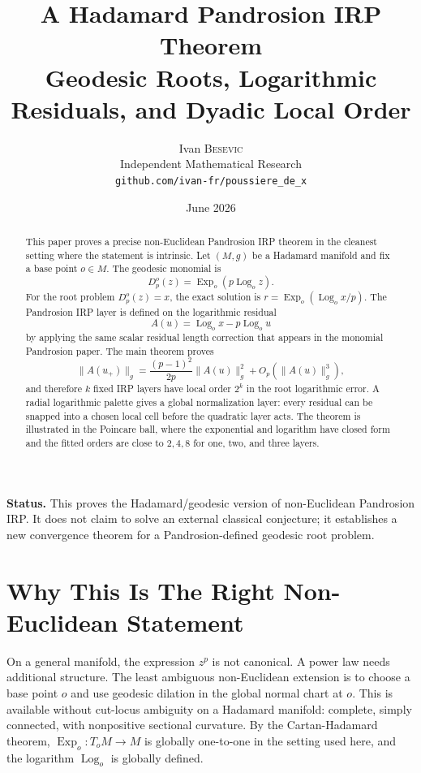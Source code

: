 \documentclass[10pt,a4paper]{article}
\title{\bfseries A Hadamard Pandrosion IRP Theorem\\[-0.1em]
\large Geodesic Roots, Logarithmic Residuals, and Dyadic Local Order}
\author{Ivan \textsc{Besevic}\\[-0.2em]
\small Independent Mathematical Research\\[-0.2em]
\small \texttt{github.com/ivan-fr/poussiere\_de\_x}}
\date{June 2026}
\theoremstyle{plain}
\theoremstyle{definition}
\newcommand{\Exp}{\operatorname{Exp}}
\newcommand{\Log}{\operatorname{Log}}
\newenvironment{takeaway}{%
  \begin{center}\begin{minipage}{0.92\linewidth}\small\itshape\color{blue!45!black}%
}{%
  \end{minipage}\end{center}%
}
\begin{document}
\maketitle

\begin{abstract}
This paper proves a precise non-Euclidean Pandrosion IRP theorem in the cleanest
setting where the statement is intrinsic.  Let $(M,g)$ be a Hadamard manifold
and fix a base point $o\in M$.  The geodesic monomial is
\[
  D_p^o(z)=\Exp_o(p\Log_o z).
\]
For the root problem $D_p^o(z)=x$, the exact solution is
$r=\Exp_o(\Log_o x/p)$.  The Pandrosion IRP layer is defined on the logarithmic
residual
\[
  A(u)=\Log_o x-p\Log_o u
\]
by applying the same scalar residual length correction that appears in the
monomial Pandrosion paper.  The main theorem proves
\[
  \|A(u_+)\|_g
    =\frac{(p-1)^2}{2p}\|A(u)\|_g^2
      +O_p(\|A(u)\|_g^3),
\]
and therefore $k$ fixed IRP layers have local order $2^k$ in the root
logarithmic error.  A radial logarithmic palette gives a global normalization
layer: every residual can be snapped into a chosen local cell before the
quadratic layer acts.  The theorem is illustrated in the Poincare ball, where
the exponential and logarithm have closed form and the fitted orders are close
to $2,4,8$ for one, two, and three layers.
\end{abstract}

\begin{takeaway}
\textbf{Status.}
This proves the Hadamard/geodesic version of non-Euclidean Pandrosion IRP.  It
does not claim to solve an external classical conjecture; it establishes a
new convergence theorem for a Pandrosion-defined geodesic root problem.
\end{takeaway}

\section{Why This Is The Right Non-Euclidean Statement}

On a general manifold, the expression $z^p$ is not canonical.  A power law needs
additional structure.  The least ambiguous non-Euclidean extension is to choose
a base point $o$ and use geodesic dilation in the global normal chart at $o$.
This is available without cut-locus ambiguity on a Hadamard manifold: complete,
simply connected, with nonpositive sectional curvature.  By the Cartan-Hadamard
theorem, $\Exp_o:T_oM\to M$ is globally one-to-one in the setting used here, and
the logarithm $\Log_o$ is globally defined.
\end{document}
